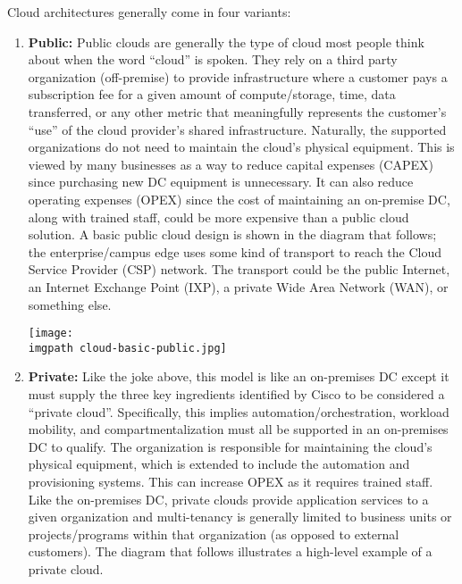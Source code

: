 Cloud architectures generally come in four variants:
\begin{enumerate}
  \item \textbf{Public:} Public clouds are generally the type of cloud most people think
  about when the word ``cloud'' is spoken. They rely on a third party organization
  (off-premise) to provide infrastructure where a customer pays a subscription
  fee for a given amount of compute/storage, time, data transferred, or any
  other metric that meaningfully represents the customer’s ``use'' of the cloud
  provider’s shared infrastructure. Naturally, the supported organizations do
  not need to maintain the cloud’s physical equipment. This is viewed by many
  businesses as a way to reduce capital expenses (CAPEX) since purchasing new
  DC equipment is unnecessary. It can also reduce operating expenses (OPEX)
  since the cost of maintaining an on-premise DC, along with trained staff,
  could be more expensive than a public cloud solution. A basic public cloud
  design is shown in the diagram that follows; the enterprise/campus edge uses some
  kind of transport to reach the Cloud Service Provider (CSP) network. The
  transport could be the public Internet, an Internet Exchange Point (IXP),
  a private Wide Area Network (WAN), or something else.

    \begin{minipage}[t]{\linewidth}
	  \centering
      \texttt{[image: \\imgpath cloud-basic-public.jpg]}
    \end{minipage}

% 
% 
  \item \textbf{Private:} Like the joke above, this model is like an on-premises
  DC except it must supply the three key ingredients identified by Cisco to be
  considered a ``private cloud''. Specifically, this implies
  automation/orchestration, workload mobility, and compartmentalization must
  all be supported in an on-premises DC to qualify. The organization is
  responsible for maintaining the cloud’s physical equipment, which is
  extended to include the automation and provisioning systems. This can
  increase OPEX as it requires trained staff. Like the on-premises DC, private
  clouds provide application services to a given organization and
  multi-tenancy is generally limited to business units or projects/programs
  within that organization (as opposed to external customers). The diagram
  that follows illustrates a high-level example of a private cloud.


\end{enumerate}
